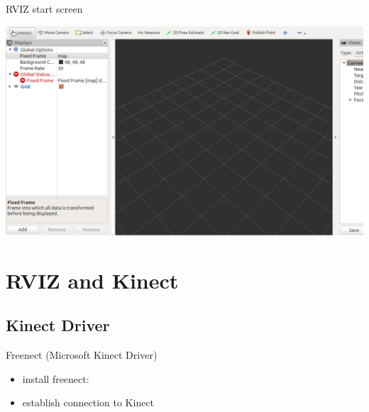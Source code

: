 \documentclass{beamer}
\begin{document}
\begin{frame}{RVIZ start screen}	

	\includegraphics[width=\textwidth]{./images/RVIZ_Start_Screen.png}

\end{frame}


\section{RVIZ and Kinect}
\subsection{Kinect Driver}
\begin{frame}{Freenect (Microsoft Kinect Driver)}	

	\begin{itemize}
	
		\item install freenect: \\
			
		
		\item establish connection to Kinect \\
			
		
	\end{itemize}

\end{frame}

\end{document}
